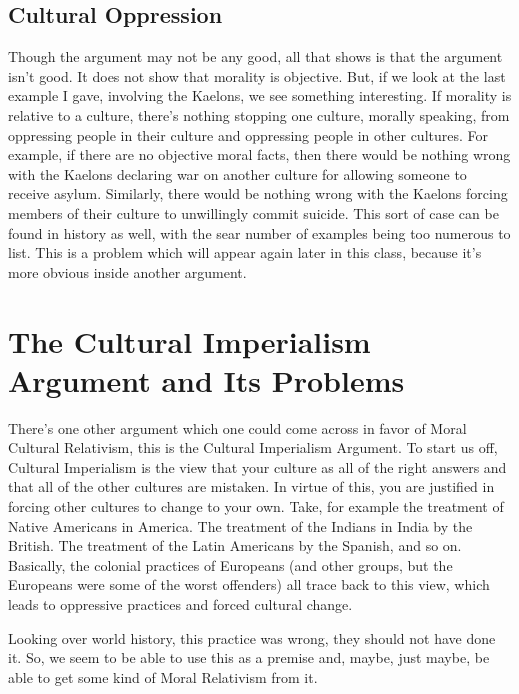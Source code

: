 \subsection{Cultural Oppression}

Though the argument may not be any good, all that shows is that the argument isn't good. It does not show that morality is objective. But, if we look at the last example I gave, involving the Kaelons, we see something interesting. If morality is relative to a culture, there's nothing stopping one culture, morally speaking, from oppressing people in their culture and oppressing people in other cultures. For example, if there are no objective moral facts, then there would be nothing wrong with the Kaelons declaring war on another culture for allowing someone to receive asylum. Similarly, there would be nothing wrong with the Kaelons forcing members of their culture to unwillingly commit suicide. This sort of case can be found in history as well, with the sear number of examples being too numerous to list. This is a problem which will appear again later in this class, because it's more obvious inside another argument.  

\section{The Cultural Imperialism Argument and Its Problems}

There's one other argument which one could come across in favor of Moral Cultural Relativism, this is the Cultural Imperialism Argument. To start us off, Cultural Imperialism is the view that your culture as all of the right answers and that all of the other cultures are mistaken. In virtue of this, you are justified in forcing other cultures to change to your own. Take, for example the treatment of Native Americans in America. The treatment of the Indians in India by the British. The treatment of the Latin Americans by the Spanish, and so on. Basically, the colonial practices of Europeans (and other groups, but the Europeans were some of the worst offenders) all trace back to this view, which leads to oppressive practices and forced cultural change. 

Looking over world history, this practice was wrong, they should not have done it. So, we seem to be able to use this as a premise and, maybe, just maybe, be able to get some kind of Moral Relativism from it.

